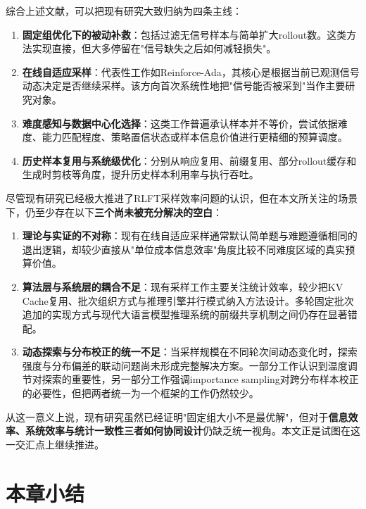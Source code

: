 综合上述文献，可以把现有研究大致归纳为四条主线：

\begin{enumerate}
    \item \textbf{固定组优化下的被动补救}：包括过滤无信号样本与简单扩大rollout数。这类方法实现直接，但大多停留在"信号缺失之后如何减轻损失"。
    
    \item \textbf{在线自适应采样}：代表性工作如Reinforce-Ada，其核心是根据当前已观测信号动态决定是否继续采样。该方向首次系统性地把"信号能否被采到"当作主要研究对象。
    
    \item \textbf{难度感知与数据中心化选择}：这类工作普遍承认样本并不等价，尝试依据难度、能力匹配程度、策略置信状态或样本信息价值进行更精细的预算调度。
    
    \item \textbf{历史样本复用与系统级优化}：分别从响应复用、前缀复用、部分rollout缓存和生成时剪枝等角度，提升历史样本利用率与执行吞吐。
\end{enumerate}

尽管现有研究已经极大推进了RLFT采样效率问题的认识，但在本文所关注的场景下，仍至少存在以下\textbf{三个尚未被充分解决的空白}：

\begin{enumerate}
    \item \textbf{理论与实证的不对称}：现有在线自适应采样通常默认简单题与难题遵循相同的退出逻辑，却较少直接从"单位成本信息效率"角度比较不同难度区域的真实预算价值。
    
    \item \textbf{算法层与系统层的耦合不足}：现有采样工作主要关注统计效率，较少把KV Cache复用、批次组织方式与推理引擎并行模式纳入方法设计。多轮固定批次追加的实现方式与现代大语言模型推理系统的前缀共享机制之间仍存在显著错配。
    
    \item \textbf{动态探索与分布校正的统一不足}：当采样规模在不同轮次间动态变化时，探索强度与分布偏差的联动问题尚未形成完整解决方案。一部分工作认识到温度调节对探索的重要性，另一部分工作强调importance sampling对跨分布样本校正的必要性，但把两者统一为一个框架的工作仍然较少。
\end{enumerate}

从这一意义上说，现有研究虽然已经证明"固定组大小不是最优解"，但对于\textbf{信息效率、系统效率与统计一致性三者如何协同设计}仍缺乏统一视角。本文正是试图在这一交汇点上继续推进。

\section{本章小结}
\label{sec:related_work_summary}

